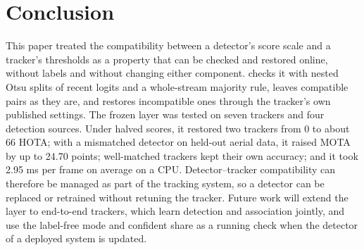 \section{Conclusion}\label{sec:conclusion}

This paper treated the compatibility between a detector's score scale and a tracker's thresholds
as a property that can be checked and restored online, without labels and without changing either
component. \scl{} checks it with nested Otsu splits of recent logits and a whole-stream majority
rule, leaves compatible pairs as they are, and restores incompatible ones through the tracker's own
published settings. The frozen layer was tested on seven trackers and four
detection sources. Under halved scores, it restored two trackers from 0 to about 66 HOTA; with a
mismatched detector on held-out aerial data, it raised MOTA by up to 24.70 points; well-matched
trackers kept their own accuracy; and it took 2.95 ms per frame on average on a CPU.
Detector--tracker compatibility can therefore be managed as part of the tracking system, so a
detector can be replaced or retrained without retuning the tracker. Future work will extend the
layer to end-to-end trackers, which learn detection and association jointly, and use the label-free
mode and confident share as a running check when the detector of a deployed system is updated.
